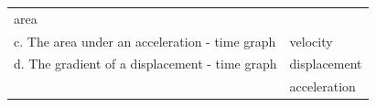 \begin{enumerate}[noitemsep, label=\textbf{\arabic*}. ]
{\begin{tabular}[t]{|l|l|}
    
        area%
     \tabularnewline\cline{1-1}\cline{2-2}
    
    
        c. The area under an acceleration - time graph &
    
    
        velocity%
     \tabularnewline\cline{1-1}\cline{2-2}
    
    
        d. The gradient of a displacement - time graph &
    
    
        displacement%
     \tabularnewline\cline{1-1}\cline{2-2}
    
    
         &
    
    
        acceleration%
     \tabularnewline\cline{1-1}\cline{2-2}
    

\end{tabular}}
\end{enumerate}
